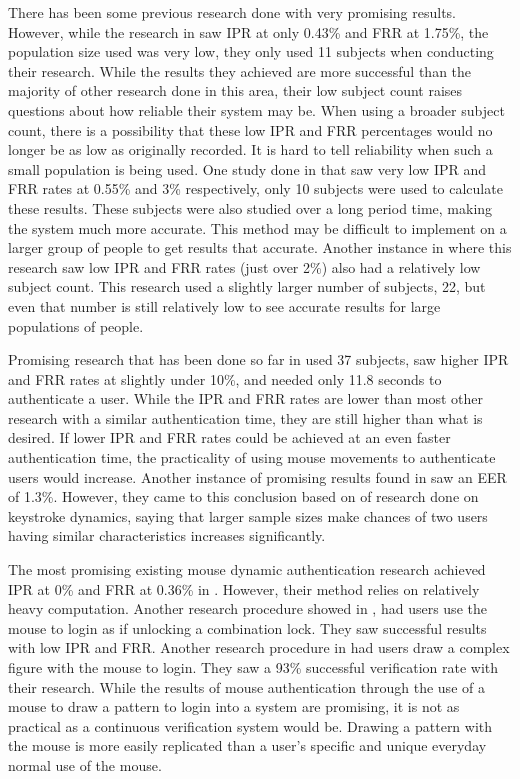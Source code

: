 \documentclass[conference]{IEEEtran}
\begin{document}
There has been some previous research done with very promising results. However, while the research in \cite{Pus} saw IPR at only 0.43\% and FRR at 1.75\%, the population size used was very low, they only used 11 subjects when conducting their research. While the results they achieved are more successful than the majority of other research done in this area, their low subject count raises questions about how reliable their system may be. When using a broader subject count, there is a possibility that these low IPR and FRR percentages would no longer be as low as originally recorded. It is hard to tell reliability when such a small population is being used. One study done in \cite{She} that saw very low IPR and FRR rates at 0.55\% and 3\% respectively, only 10 subjects were used to calculate these results. These subjects were also studied over a long period time, making the system much more accurate. This method may be difficult to implement on a larger group of people to get results that accurate. Another instance in \cite{Ahmed} where this research saw low IPR and FRR rates (just over 2\%) also had a relatively low subject count. This research used a slightly larger number of subjects, 22, but even that number is still relatively low to see accurate results for large populations of people. 

Promising research that has been done so far in \cite{CS} used 37 subjects, saw higher IPR and FRR rates at slightly under 10\%, and needed only 11.8 seconds to authenticate a user. While the IPR and FRR rates are lower than most other research with a similar authentication time, they are still higher than what is desired. If lower IPR and FRR rates could be achieved at an even faster authentication time, the practicality of using mouse movements to authenticate users would increase. Another instance of promising results found in \cite{Zhe} saw an EER of 1.3\%. However, they came to this conclusion based on of research done on keystroke dynamics, saying that larger sample sizes make chances of two users having similar characteristics increases significantly.

The most promising existing mouse dynamic authentication research achieved IPR at 0\% and FRR at 0.36\% in \cite{Nak}. However, their method relies on relatively heavy computation. Another research procedure showed in \cite{Syu}, had users use the mouse to login as if unlocking a combination lock. They saw successful results with low IPR and FRR. Another research procedure in \cite{HJ} had users draw a complex figure with the mouse to login. They saw a 93\% successful verification rate with their research. While the results of mouse authentication through the use of a mouse to draw a pattern to login into a system are promising, it is not as practical as a continuous verification system would be. Drawing a pattern with the mouse is more easily replicated than a user’s specific and unique everyday normal use of the mouse.   
\end{document}
